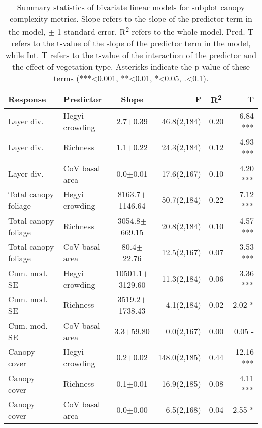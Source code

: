 \begin{table}[H]
\centering
\begin{tabular}{llS[table-format=5.1(4.2)]rS[table-format=1.2]r}
  \hline
Response & Predictor & Slope & F & R\textsuperscript{2} & T \\ 
  \hline
Layer div. & Hegyi crowding & 2.7$\pm$0.39 & 46.8(2,184) & 0.20 & 6.84 *** \\ 
  Layer div. & Richness & 1.1$\pm$0.22 & 24.3(2,184) & 0.12 & 4.93 *** \\ 
  Layer div. & CoV basal area & 0.0$\pm$0.01 & 17.6(2,167) & 0.10 & 4.20 *** \\ 
  Total canopy foliage & Hegyi crowding & 8163.7$\pm$1146.64 & 50.7(2,184) & 0.22 & 7.12 *** \\ 
  Total canopy foliage & Richness & 3054.8$\pm$669.15 & 20.8(2,184) & 0.10 & 4.57 *** \\ 
  Total canopy foliage & CoV basal area & 80.4$\pm$22.76 & 12.5(2,167) & 0.07 & 3.53 *** \\ 
  Cum. mod. SE & Hegyi crowding & 10501.1$\pm$3129.60 & 11.3(2,184) & 0.06 & 3.36 *** \\ 
  Cum. mod. SE & Richness & 3519.2$\pm$1738.43 & 4.1(2,184) & 0.02 & 2.02 * \\ 
  Cum. mod. SE & CoV basal area & 3.3$\pm$59.80 & 0.0(2,167) & 0.00 & 0.05 - \\ 
  Canopy cover & Hegyi crowding & 0.2$\pm$0.02 & 148.0(2,185) & 0.44 & 12.16 *** \\ 
  Canopy cover & Richness & 0.1$\pm$0.01 & 16.9(2,185) & 0.08 & 4.11 *** \\ 
  Canopy cover & CoV basal area & 0.0$\pm$0.00 & 6.5(2,168) & 0.04 & 2.55 * \\ 
   \hline
\end{tabular}
\caption{Summary statistics of bivariate linear models for subplot canopy complexity metrics. Slope refers to the slope of the predictor term in the model, $\pm{}$ 1 standard error. R\textsuperscript{2} refers to the whole model. Pred. T refers to the t-value of the slope of the predictor term in the model, while Int. T refers to the t-value of the interaction of the predictor and the effect of vegetation type. Asterisks indicate the p-value of these terms (***<0.001, **<0.01, *<0.05, .<0.1).} 
\label{mod_bivar_lm_summ}
\end{table}

